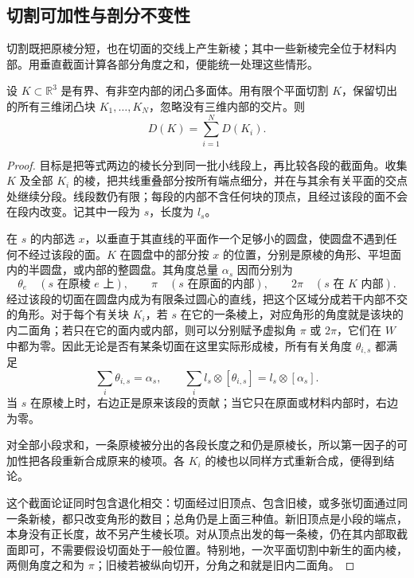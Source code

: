\subsection{切割可加性与剖分不变性}
\label{g1:subsec:E05:03}

切割既把原棱分短，也在切面的交线上产生新棱；其中一些新棱完全位于材料内部。用垂直截面计算各部分角度之和，便能统一处理这些情形。

\begin{lemma}
	\label{g1:lem:dehn-hyperplane-additivity}
	设 \(K\subset\mathbb R^3\) 是有界、有非空内部的闭凸多面体。用有限个平面切割 \(K\)，保留切出的所有三维闭凸块 \(K_1,\ldots,K_N\)，忽略没有三维内部的交片。则
	\[
		D(K)=\sum_{i=1}^N D(K_i).
	\]
\end{lemma}
\begin{proof}
	目标是把等式两边的棱长分到同一批小线段上，再比较各段的截面角。收集 \(K\) 及全部 \(K_i\) 的棱，把共线重叠部分按所有端点细分，并在与其余有关平面的交点处继续分段。线段数仍有限；每段的内部不含任何块的顶点，且经过该段的面不会在段内改变。记其中一段为 \(s\)，长度为 \(l_s\)。

	在 \(s\) 的内部选 \(x\)，以垂直于其直线的平面作一个足够小的圆盘，使圆盘不遇到任何不经过该段的面。\(K\) 在圆盘中的部分按 \(x\) 的位置，分别是原棱的角形、平坦面内的半圆盘，或内部的整圆盘。其角度总量 \(\alpha_s\) 因而分别为
	\[
		\theta_e\quad(s\text{ 在原棱 }e\text{ 上}),\qquad
		\pi\quad(s\text{ 在原面的内部}),\qquad
		2\pi\quad(s\text{ 在 }K\text{ 内部}).
	\]
	经过该段的切面在圆盘内成为有限条过圆心的直线，把这个区域分成若干内部不交的角形。对于每个有关块 \(K_i\)，若 \(s\) 在它的一条棱上，对应角形的角度就是该块的内二面角；若只在它的面内或内部，则可以分别赋予虚拟角 \(\pi\) 或 \(2\pi\)，它们在 \(W\) 中都为零。因此无论是否有某条切面在这里实际形成棱，所有有关角度 \(\theta_{i,s}\) 都满足
	\[
		\sum_i\theta_{i,s}=\alpha_s,
		\qquad
		\sum_i l_s\otimes[\theta_{i,s}]
		=l_s\otimes[\alpha_s].
	\]
	当 \(s\) 在原棱上时，右边正是原来该段的贡献；当它只在原面或材料内部时，右边为零。

	对全部小段求和，一条原棱被分出的各段长度之和仍是原棱长，所以第一因子的可加性把各段重新合成原来的棱项。各 \(K_i\) 的棱也以同样方式重新合成，便得到结论。

	这个截面论证同时包含退化相交：切面经过旧顶点、包含旧棱，或多张切面通过同一条新棱，都只改变角形的数目；总角仍是上面三种值。新旧顶点是小段的端点，本身没有正长度，故不另产生棱长项。对从顶点出发的每一条棱，仍在其内部取截面即可，不需要假设切面处于一般位置。特别地，一次平面切割中新生的面内棱，两侧角度之和为 \(\pi\)；旧棱若被纵向切开，分角之和就是旧内二面角。
\end{proof}

